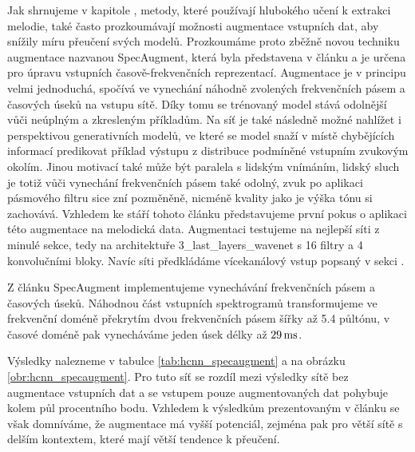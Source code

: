 Jak shrnujeme v kapitole , metody, které používají hlubokého učení k extrakci melodie, také často prozkoumávají možnosti augmentace vstupních dat, aby snížily míru přeučení svých modelů. Prozkoumáme proto zběžně novou techniku augmentace nazvanou SpecAugment, která byla představena v článku \cite{Park2019} a je určena pro úpravu vstupních časově-frekvenčních reprezentací. Augmentace je v principu velmi jednoduchá, spočívá ve vynechání náhodně zvolených frekvenčních pásem a časových úseků na vstupu sítě. Díky tomu se trénovaný model stává odolnější vůči neúplným a zkresleným příkladům. Na síť je také následně možné nahlížet i perspektivou generativních modelů, ve které se model snaží v místě chybějících informací predikovat příklad výstupu z distribuce podmíněné vstupním zvukovým okolím. Jinou motivací také může být paralela s lidským vnímáním, lidský sluch je totiž vůči vynechání frekvenčních pásem také odolný, zvuk po aplikaci pásmového filtru sice zní pozměněně, nicméně kvality jako je výška tónu si zachovává. Vzhledem ke stáří tohoto článku představujeme první pokus o aplikaci této augmentace na melodická data. Augmentaci testujeme na nejlepší síti z minulé sekce, tedy na architektuře 3\_last\_layers\_wavenet s 16 filtry a 4 konvolučními bloky. Navíc síti předkládáme vícekanálový vstup popsaný v sekci .

Z článku SpecAugment implementujeme vynechávání frekvenčních pásem a časových úseků. Náhodnou část vstupních spektrogramů transformujeme ve frekvenční doméně překrytím dvou frekvenčních pásem šířky až 5.4 půltónu, v časové doméně pak vynecháváme jeden úsek délky až $29\,\rm ms$.


Výsledky nalezneme v tabulce \ref{tab:hcnn_specaugment} a na obrázku \ref{obr:hcnn_specaugment}. Pro tuto síť se rozdíl mezi výsledky sítě bez augmentace vstupních dat a se vstupem pouze augmentovaných dat pohybuje kolem půl procentního bodu. Vzhledem k výsledkům prezentovaným v článku \cite{Park2019} se však domníváme, že augmentace má vyšší potenciál, zejména pak pro větší sítě s delším kontextem, které mají větší tendence k přeučení.




